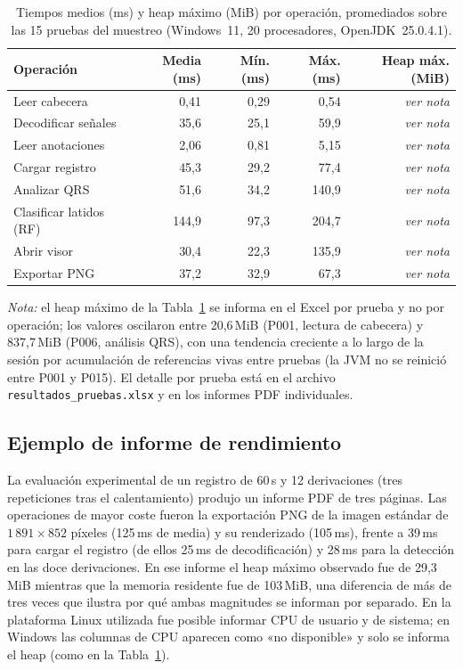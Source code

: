 \begin{table}[t]
\centering\footnotesize
\caption{Tiempos medios (ms) y heap máximo (MiB) por operación,
promediados sobre las 15 pruebas del muestreo (Windows~11, 20
procesadores, OpenJDK~25.0.4.1).}
\label{tab:tiempos}
\begin{tabular}{@{}lrrrr@{}}
\toprule
Operación & Media (ms) & Mín. (ms) & Máx. (ms) & Heap máx. (MiB)\\
\midrule
Leer cabecera & 0,41 & 0,29 & 0,54 & \emph{ver nota}\\
Decodificar señales & 35,6 & 25,1 & 59,9 & \emph{ver nota}\\
Leer anotaciones & 2,06 & 0,81 & 5,15 & \emph{ver nota}\\
Cargar registro & 45,3 & 29,2 & 77,4 & \emph{ver nota}\\
Analizar QRS & 51,6 & 34,2 & 140,9 & \emph{ver nota}\\
Clasificar latidos (RF) & 144,9 & 97,3 & 204,7 & \emph{ver nota}\\
Abrir visor & 30,4 & 22,3 & 135,9 & \emph{ver nota}\\
Exportar PNG & 37,2 & 32,9 & 67,3 & \emph{ver nota}\\
\bottomrule
\end{tabular}
\end{table}

\emph{Nota:} el heap máximo de la Tabla~\ref{tab:tiempos} se informa en
el Excel por prueba y no por operación; los valores oscilaron entre
20,6\,MiB (P001, lectura de cabecera) y 837,7\,MiB (P006, análisis QRS),
con una tendencia creciente a lo largo de la sesión por acumulación de
referencias vivas entre pruebas (la JVM no se reinició entre P001 y
P015). El detalle por prueba está en el archivo
\texttt{resultados\_pruebas.xlsx} y en los informes PDF individuales.



\subsection{Ejemplo de informe de rendimiento}
La evaluación experimental de un registro de 60\,s y 12 derivaciones
(tres repeticiones tras el calentamiento) produjo un informe PDF de tres
páginas. Las operaciones de mayor coste fueron la exportación PNG de la
imagen estándar de $1\,891\times852$ píxeles (125\,ms de media) y su
renderizado (105\,ms), frente a 39\,ms para cargar el registro (de ellos
25\,ms de decodificación) y 28\,ms para la detección en las doce
derivaciones. En ese informe el heap máximo observado fue de 29,3\,MiB
mientras que la memoria residente fue de 103\,MiB, una diferencia de más
de tres veces que ilustra por qué ambas magnitudes se informan por
separado. En la plataforma Linux utilizada fue posible informar CPU de
usuario y de sistema; en Windows las columnas de CPU aparecen como «no
disponible» y solo se informa el heap (como en la
Tabla~\ref{tab:tiempos}).
